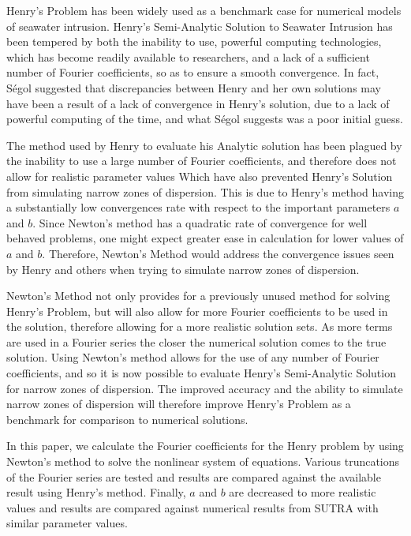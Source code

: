 Henry's Problem has been widely used as a benchmark case for numerical models of seawater intrusion.
Henry's Semi-Analytic Solution to Seawater Intrusion has been tempered by both the inability to use,
powerful computing technologies, which has become readily available to researchers, and a lack of a
sufficient number of Fourier coefficients, so as to ensure a smooth convergence. In fact, S\'egol
\cite{Segol} suggested that discrepancies between Henry and her own solutions may have been a result
of a lack of convergence in Henry's solution, due to a lack of powerful computing of the time, and
what S\'egol suggests was a poor initial guess. 

The method used by Henry to evaluate his Analytic solution has been plagued by the inability to use
a large number of Fourier coefficients, and therefore does not allow for realistic parameter values
Which have also prevented Henry's Solution from simulating narrow zones of dispersion. This is due
to Henry's method having a substantially low convergences rate with respect to the important
parameters $a$ and $b$.  Since Newton's method has a quadratic rate of convergence for well behaved
problems, one might expect greater ease in calculation for lower values of $a$ and $b$.  Therefore,
Newton's Method would address the convergence issues seen by Henry and others when trying to
simulate narrow zones of dispersion.

Newton's Method not only provides for a previously unused method for solving Henry's Problem, but
will also allow for more Fourier coefficients to be used in the solution, therefore allowing for a
more realistic solution sets. As more terms are used in a Fourier series the closer the numerical
solution comes to the true solution. Using Newton's method allows for the use of any number of
Fourier coefficients, and so it is now possible to evaluate Henry's Semi-Analytic Solution for
narrow zones of dispersion. The improved accuracy and the ability to simulate narrow zones of
dispersion will therefore improve Henry's Problem as a benchmark for comparison to numerical
solutions.

In this paper, we calculate the Fourier coefficients for the Henry problem by using Newton's method
to solve the nonlinear system of equations. Various truncations of the Fourier series are tested and
results are compared against the available result using Henry's method. Finally, $a$ and $b$ are
decreased to more realistic values and results are compared against numerical results from SUTRA
with similar parameter values.
